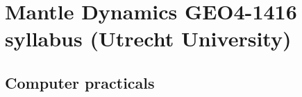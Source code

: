 \chapter{Mantle Dynamics GEO4-1416 syllabus (Utrecht University)} %






\newpage

\section{Computer practicals} 

